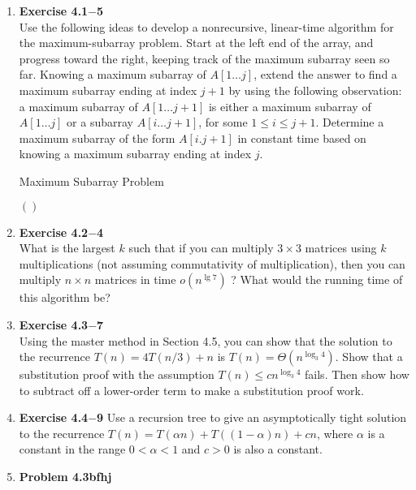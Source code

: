 \documentclass[a4paper,11pt,oneside]{book}
\begin{document}
\begin{enumerate}
  \item {\textbf{Exercise 4.1$-$5}}
  \\ Use the following ideas to develop a nonrecursive, linear-time algorithm for the maximum-subarray problem. Start at the left end of the array, and progress toward the right, keeping track of the maximum subarray seen so far. Knowing a maximum subarray of $A[1 \ldots j]$, extend the answer to find a maximum subarray ending at index $j+1$ by using the following observation: a maximum subarray of $A[1 \ldots j+1]$ is either a maximum subarray of $A[1 \ldots j]$ or a subarray $A[i \ldots j+1]$, for some $1 \leq i \leq j+1$. Determine a maximum subarray of the form $A[i . j+1]$ in constant time based on knowing a maximum subarray ending at index $j$.
  \begin{algorithm}
    \caption{Maximum Subarray Problem}
    \begin{algorithmic}[1]
        \Statex

        \Return $\mathbf{()}$

        \EndFunction
    \end{algorithmic}
\end{algorithm}



  \item {\textbf{Exercise 4.2$-$4}}
  \\ What is the largest $k$ such that if you can multiply $3 \times 3$ matrices using $k$ multiplications (not assuming commutativity of multiplication), then you can multiply $n \times n$ matrices in time $o\left(n^{\lg 7}\right)$ ? What would the running time of this algorithm be?
  
  \item {\textbf{Exercise 4.3$-$7}}
  \\ Using the master method in Section 4.5, you can show that the solution to the recurrence $T(n)=4 T(n / 3)+n$ is $T(n)=\Theta\left(n^{\log _3 4}\right)$. Show that a substitution proof with the assumption $T(n) \leq c n^{\log _3 4}$ fails. Then show how to subtract off a lower-order term to make a substitution proof work.

  
  \item {\textbf{Exercise 4.4$-$9}}
   Use a recursion tree to give an asymptotically tight solution to the recurrence $T(n)=T(\alpha n)+T((1-\alpha) n)+c n$, where $\alpha$ is a constant in the range $0<\alpha<1$ and $c>0$ is also a constant.
  
  \item {\textbf{Problem 4.3bfhj}}
  
\end{enumerate}
\end{document}
